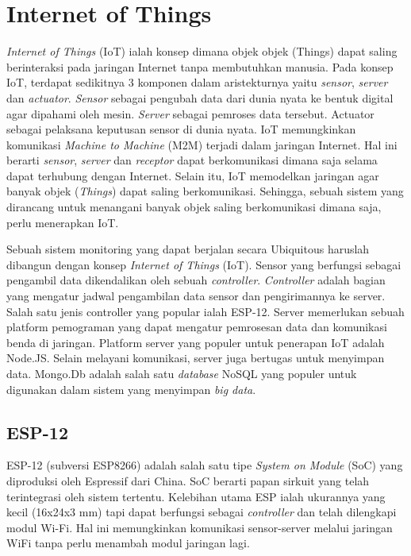 \section{Internet of Things}
\textit{Internet of Things} (IoT) ialah konsep dimana objek objek (Things) dapat saling berinteraksi pada jaringan Internet tanpa membutuhkan manusia. Pada konsep IoT, terdapat sedikitnya 3 komponen dalam aristekturnya yaitu \textit{sensor}, \textit{server} dan \textit{actuator}. \textit{Sensor} sebagai pengubah data dari dunia nyata ke bentuk digital agar dipahami oleh mesin. \textit{Server} sebagai pemroses data tersebut. Actuator sebagai pelaksana keputusan sensor di dunia nyata. IoT memungkinkan komunikasi \textit{Machine to Machine} (M2M) terjadi dalam jaringan Internet. Hal ini berarti \textit{sensor}, \textit{server} dan \textit{receptor} dapat berkomunikasi dimana saja selama dapat terhubung dengan Internet. Selain itu, IoT memodelkan jaringan agar banyak objek (\textit{Things}) dapat saling berkomunikasi. Sehingga, sebuah sistem yang dirancang untuk menangani banyak objek saling berkomunikasi dimana saja, perlu menerapkan IoT.

Sebuah sistem monitoring yang dapat berjalan secara Ubiquitous haruslah dibangun dengan konsep \textit{Internet of Things} (IoT). Sensor yang berfungsi sebagai pengambil data dikendalikan oleh sebuah \textit{controller}. \textit{Controller} adalah bagian yang mengatur jadwal pengambilan data sensor dan pengirimannya ke server. Salah satu jenis controller yang popular ialah ESP-12. Server memerlukan sebuah platform pemograman yang dapat mengatur pemrosesan data dan komunikasi benda di jaringan. Platform server yang populer untuk penerapan IoT adalah Node.JS. Selain melayani komunikasi, server juga bertugas untuk menyimpan data. Mongo.Db adalah salah satu \textit{database} NoSQL yang populer untuk digunakan dalam sistem yang menyimpan \textit{big data}.

\subsection{ESP-12}
ESP-12 (subversi ESP8266) adalah salah satu tipe \textit{System on Module} (SoC) yang diproduksi oleh Espressif dari China. SoC berarti papan sirkuit yang telah terintegrasi oleh sistem tertentu. Kelebihan utama ESP ialah ukurannya yang kecil (16x24x3 mm) tapi dapat berfungsi sebagai \textit{controller} dan telah dilengkapi modul Wi-Fi. Hal ini memungkinkan komunikasi sensor-server melalui jaringan WiFi tanpa perlu menambah modul jaringan lagi.

